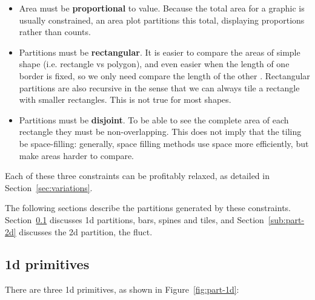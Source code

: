 \documentclass[letterpaper,oneside]{scrartcl}
\begin{document}
\begin{itemize}
  \item Area must be {\bf proportional} to value. Because the total area for a graphic is usually constrained, an area plot partitions this total, displaying proportions rather than counts.

  \item Partitions must be {\bf rectangular}. It is easier to compare the areas of simple shape (i.e. rectangle vs polygon), and even easier when the length of one border is fixed, so we only need compare the length of the other \citep{cleveland:1984}. Rectangular partitions are also recursive in the sense that we can always tile a rectangle with smaller rectangles. This is not true for most shapes.

  \item Partitions must be {\bf disjoint}. To be able to see the complete area of each rectangle they must be non-overlapping. This does not imply that the tiling be space-filling: generally, space filling methods use space more efficiently, but make areas harder to compare.

\end{itemize}

\noindent Each of these three constraints can be profitably relaxed, as detailed in Section~\ref{sec:variations}.

The following sections describe the partitions generated by these constraints. Section~\ref{sub:part-1d} discusses 1d partitions, bars, spines and tiles, and  Section~\ref{sub:part-2d} discusses the 2d partition, the fluct.


\subsection{1d primitives}
\label{sub:part-1d}

There are three 1d primitives, as shown in Figure~\ref{fig:part-1d}:
\end{document}
